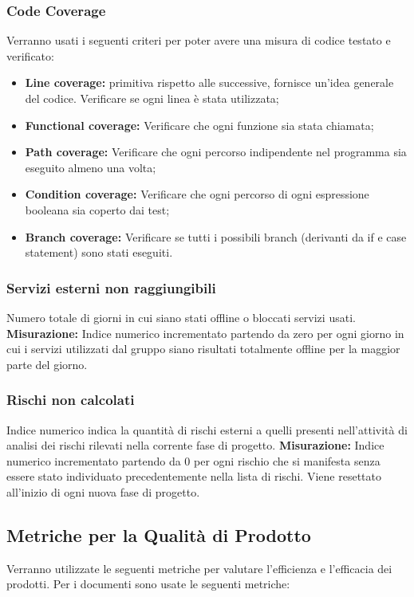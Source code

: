 	 	\subsubsection{Code Coverage} Verranno usati i seguenti criteri per poter avere una misura di codice testato e verificato:\newline
	 		\begin{itemize}
	 			\item \textbf{Line coverage:} primitiva rispetto alle successive, fornisce un’idea generale del codice. Verificare se ogni linea è stata utilizzata;
	 			\item \textbf{Functional coverage:} Verificare che ogni funzione sia stata chiamata;
	 			\item \textbf{Path coverage:} Verificare che ogni percorso indipendente nel programma sia eseguito almeno una volta;
	 			\item \textbf{Condition coverage:} Verificare che ogni percorso di ogni espressione booleana sia coperto dai test; 
	 			\item \textbf{Branch coverage:} Verificare se tutti i possibili branch (derivanti da if e case statement) sono stati eseguiti.
	 		\end{itemize}
		 \subsubsection{Servizi esterni non raggiungibili} Numero totale di giorni in cui siano stati offline o bloccati servizi usati.\newline
		 \textbf{Misurazione:} Indice numerico incrementato partendo da zero per ogni giorno
in cui i servizi utilizzati dal gruppo siano risultati totalmente offline per la maggior parte del giorno.\newline
		\subsubsection{Rischi non calcolati} Indice numerico indica la quantità di rischi esterni a quelli presenti nell’attività di
analisi dei rischi rilevati nella corrente fase di progetto.
\newline
		\textbf{Misurazione:} Indice numerico incrementato partendo da 0 per ogni rischio che
si manifesta senza essere stato individuato precedentemente nella lista di rischi.
		Viene resettato all’inizio di ogni nuova fase di progetto.
		\newline
	\subsection{Metriche per la Qualità di Prodotto}
		Verranno  utilizzate  le  seguenti  metriche  per  valutare  l’efficienza  e  l’efficacia  dei prodotti. \newline Per i documenti sono usate le seguenti metriche:
